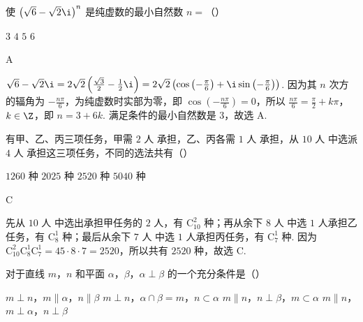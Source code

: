 \documentclass[UTF8,a4paper,oneside,11pt]{ctexbook}
\begin{document}
\begin{problem}
使 \(\left( \sqrt{6}-\sqrt{2}\i \right)^{n}\) 是纯虚数的最小自然数 \(n=\)（\quad）

\choices
    {\(3\)}
    {\(4\)}
    {\(5\)}
    {\(6\)}
\end{problem}

\begin{answer}
A
\end{answer}

\begin{solution}
\(\sqrt{6}-\sqrt{2}\i=2\sqrt{2}\left( \frac{\sqrt{3}}{2}-\frac{1}{2}\i \right)=2\sqrt{2}\left( \cos\left( -\frac{\pi}{6} \right)+\i\sin\left( -\frac{\pi}{6} \right) \right)\). 因为其 \(n\) 次方的辐角为 \(-\frac{n\pi}{6}\)，为纯虚数时实部为零，即 \(\cos\left( -\frac{n\pi}{6} \right)=0\)，所以 \(\frac{n\pi}{6}=\frac{\pi}{2}+k\pi\)，\(k\in\Z\)，即 \(n=3+6k\). 满足条件的最小自然数是 \(3\)，故选 A.
\end{solution}

\begin{problem}
有甲、乙、丙三项任务，甲需 \(2\text{ 人}\) 承担，乙、丙各需 \(1\text{ 人}\) 承担，从 \(10\text{ 人}\) 中选派 \(4\text{ 人}\) 承担这三项任务，不同的选法共有（\quad）

\choices
    {\(1260\text{ 种}\)}
    {\(2025\text{ 种}\)}
    {\(2520\text{ 种}\)}
    {\(5040\text{ 种}\)}
\end{problem}

\begin{answer}
C
\end{answer}

\begin{solution}
先从 \(10\text{ 人}\) 中选出承担甲任务的 \(2\text{ 人}\)，有 \(\mathrm C_{10}^{2}\) 种；再从余下 \(8\text{ 人}\) 中选 \(1\text{ 人}\)承担乙任务，有 \(\mathrm C_{8}^{1}\) 种；最后从余下 \(7\text{ 人}\) 中选 \(1\text{ 人}\)承担丙任务，有 \(\mathrm C_{7}^{1}\) 种. 因为 \(\mathrm C_{10}^{2}\mathrm C_{8}^{1}\mathrm C_{7}^{1}=45\cdot 8\cdot 7=2520\)，所以共有 \(2520\text{ 种}\)，故选 C.
\end{solution}

\begin{problem}
对于直线 \(m\)，\(n\) 和平面 \(\alpha\)，\(\beta\)，\(\alpha\perp\beta\) 的一个充分条件是（\quad）

\choices
    {\(m\perp n\)，\(m\parallel\alpha\)，\(n\parallel\beta\)}
    {\(m\perp n\)，\(\alpha\cap\beta=m\)，\(n\subset\alpha\)}
    {\(m\parallel n\)，\(n\perp\beta\)，\(m\subset\alpha\)}
    {\(m\parallel n\)，\(m\perp\alpha\)，\(n\perp\beta\)}
\end{problem}
\end{document}
